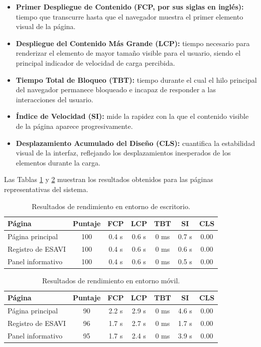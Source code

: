 \begin{itemize}
    \item \textbf{Primer Despliegue de Contenido (FCP, por sus siglas en inglés):} tiempo que transcurre hasta que el navegador muestra el primer elemento visual de la página.

    \item \textbf{Despliegue del Contenido Más Grande (LCP):} tiempo necesario para renderizar el elemento de mayor tamaño visible para el usuario, siendo el principal indicador de velocidad de carga percibida.

    \item \textbf{Tiempo Total de Bloqueo (TBT):} tiempo durante el cual el hilo principal del navegador permanece bloqueado e incapaz de responder a las interacciones del usuario.

    \item \textbf{Índice de Velocidad (SI):} mide la rapidez con la que el contenido visible de la página aparece progresivamente.

    \item \textbf{Desplazamiento Acumulado del Diseño (CLS):} cuantifica la estabilidad visual de la interfaz, reflejando los desplazamientos inesperados de los elementos durante la carga.
\end{itemize}

Las Tablas \ref{tab:rendimiento-escritorio} y \ref{tab:rendimiento-movil} muestran los resultados obtenidos para las páginas representativas del sistema.

\begin{table}[H]
\centering
\caption{Resultados de rendimiento en entorno de escritorio.}
\label{tab:rendimiento-escritorio}
\begin{tabular}{lcccccc}
\hline
\textbf{Página} & \textbf{Puntaje} & \textbf{FCP} & \textbf{LCP} & \textbf{TBT} & \textbf{SI} & \textbf{CLS} \\
\hline
Página principal       & 100 & 0.4 s & 0.6 s & 0 ms & 0.7 s & 0.00 \\
Registro de ESAVI      & 100 & 0.4 s & 0.6 s & 0 ms & 0.6 s & 0.00 \\
Panel informativo      & 100 & 0.4 s & 0.6 s & 0 ms & 0.5 s & 0.00 \\
\hline
\end{tabular}
\end{table}

\begin{table}[H]
\centering
\caption{Resultados de rendimiento en entorno móvil.}
\label{tab:rendimiento-movil}
\begin{tabular}{lcccccc}
\hline
\textbf{Página} & \textbf{Puntaje} & \textbf{FCP} & \textbf{LCP} & \textbf{TBT} & \textbf{SI} & \textbf{CLS} \\
\hline
Página principal       & 90 & 2.2 s & 2.9 s & 0 ms & 4.6 s & 0.00 \\
Registro de ESAVI      & 96 & 1.7 s & 2.7 s & 0 ms & 1.7 s & 0.00 \\
Panel informativo      & 95 & 1.7 s & 2.4 s & 0 ms & 3.9 s & 0.00 \\
\hline
\end{tabular}
\end{table}

